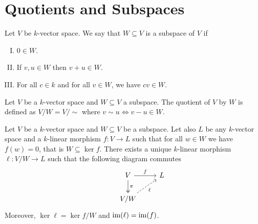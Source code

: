 \section{Quotients and Subspaces}

\begin{definition}[Subspace]\label{def: subspace}
    Let \(V\) be \(k\)-vector space. We say that \(W \subseteq  V\) is a subspace
    of \(V\) if
    \begin{enumerate}[I.]
        \item \(0 \in W\).
        \item If \(v, u \in W\) then \(v + u \in W\).
        \item For all \(c \in k\) and for all \(v \in W\), we have \(cv \in W\).
    \end{enumerate}
\end{definition}

\begin{definition}[Quotient]\label{def: quotient}
    Let \(V\) be a \(k\)-vector space and \(W \subseteq V\) a subspace. The
    quotient of \(V\) by \(W\) is defined as \(V/W = V/{\sim}\) where \(v
    \sim u \Leftrightarrow v - u \in W\).
\end{definition}

\begin{theorem}
    \label{thm: universal property for quotients}
    Let \(V\) be a \(k\)-vector space and \(W \subseteq V\) be a subspace. Let
    also \(L\) be any \(k\)-vector space and a \(k\)-linear morphism \(f : V \to L
    \) such that for all \(w \in W\) we have \(f(w) = 0\), that is \(W \subseteq \ker f\).
    There exists a unique \(k\)-linear morphism \(\ell: V/W \to L\) such that the
    following diagram commutes
    \[
        \begin{tikzcd}
            &V \ar["f", r] \ar["\pi", twoheadrightarrow, d] &L \\
            &V/W \ar[swap, dashed, "\ell", ru]
        \end{tikzcd}
    \]
    Moreover, \(\ker \ell = \ker f / W\) and  \(\operatorname{im}(\ell) = \operatorname{im}(f)\).
\end{theorem}

